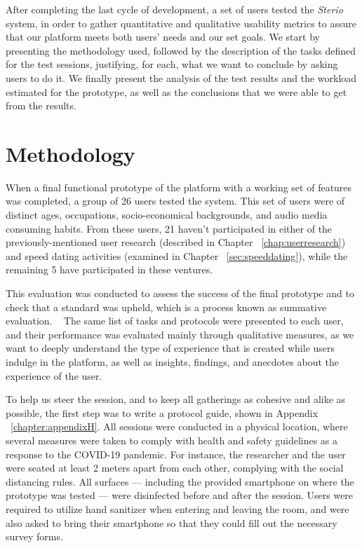 \label{chap:evaluation}

After completing the last cycle of development, a set of users tested the \textit{Sterio} system, in order to gather quantitative and qualitative usability metrics to assure that our platform meets both users’ needs and our set goals. We start by presenting the methodology used, followed by the description of the tasks defined for the test sessions, justifying, for each, what we want to conclude by asking users to do it. We finally present the analysis of the test results and the workload estimated for the prototype, as well as the conclusions that we were able to get from the results.


\section{Methodology}

When a final functional prototype of the platform with a working set of features was completed, a group of 26 users tested the system. This set of users were of distinct ages, occupations, socio-economical backgrounds, and audio media consuming habits. From these users, 21 haven't participated in either of the previously-mentioned user research (described in Chapter ~\ref{chap:userresearch}) and speed dating activities (examined in Chapter ~\ref{sec:speeddating}), while the remaining 5 have participated in these ventures.

This evaluation was conducted to assess the success of the final prototype and to check that a standard was upheld, which is a process known as summative evaluation. ~\cite{Preece2015, Courage2005} The same list of tasks and protocols were presented to each user, and their performance was evaluated mainly through qualitative measures, as we want to deeply understand the type of experience that is created while users indulge in the platform, as well as insights, findings, and anecdotes about the experience of the user.

To help us steer the session, and to keep all gatherings as cohesive and alike as possible, the first step was to write a protocol guide, shown in Appendix ~\ref{chapter:appendixH}. All sessions were conducted in a physical location, where several measures were taken to comply with health and safety guidelines as a response to the COVID-19 pandemic. For instance, the researcher and the user were seated at least 2 meters apart from each other, complying with the social distancing rules. All surfaces — including the provided smartphone on where the prototype was tested — were disinfected before and after the session. Users were required to utilize hand sanitizer when entering and leaving the room, and were also asked to bring their smartphone so that they could fill out the necessary survey forms. 


